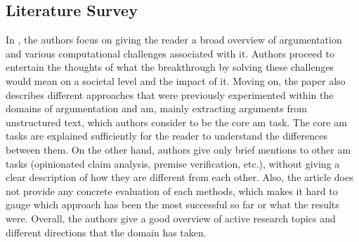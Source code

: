 \subsection{Literature Survey}

 In \autocite{Lippi2016ArgumentationMS}, the authors focus on giving the reader a broad overview of argumentation and various computational challenges associated with it. Authors proceed to entertain the thoughts of what the breakthrough by solving these challenges would mean on a societal level and the impact of it. Moving on, the paper also describes different approaches that were previously experimented within the domains of argumentation and \gls{am}, mainly extracting arguments from unstructured text, which authors consider to be the core \gls{am} task. The core \gls{am} tasks are explained sufficiently for the reader to understand the differences between them. On the other hand, authors give only brief mentions to other \gls{am} tasks (opinionated claim analysis, premise verification, etc.), without giving a clear description of how they are different from each other. Also, the article does not provide any concrete evaluation of each methods, which makes it hard to gauge which approach has been the most successful so far or what the results were. Overall, the authors give a good overview of active research topics and different directions that the domain has taken.

